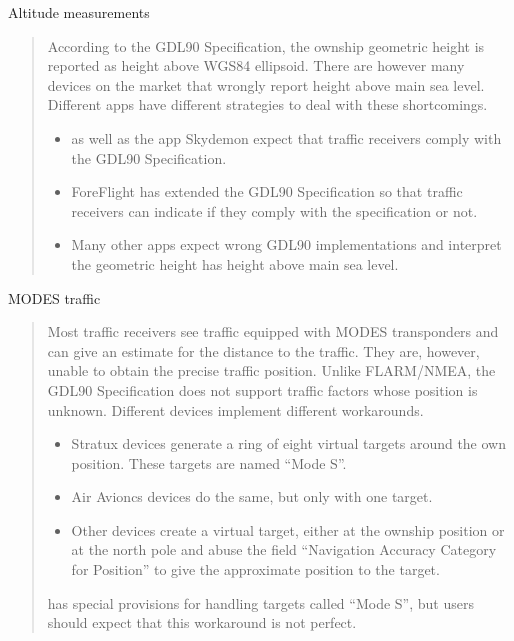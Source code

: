 \documentclass[letterpaper,10pt,english]{sphinxmanual}
\begin{document}
\sphinxAtStartPar
Altitude measurements
\begin{quote}

\sphinxAtStartPar
According to the GDL90 Specification, the ownship geometric height is reported
as height above WGS\sphinxhyphen{}84 ellipsoid.  There are however many devices on the
market that wrongly report height above main sea level.  Different apps have
different strategies to deal with these shortcomings.
\begin{itemize}
\item {} 
\sphinxAtStartPar
{} as well as the app Skydemon expect that
traffic receivers comply with the GDL90 Specification.

\item {} 
\sphinxAtStartPar
ForeFlight has extended the GDL90 Specification so that traffic receivers
can indicate if they comply with the specification or not.

\item {} 
\sphinxAtStartPar
Many other apps expect wrong GDL90 implementations and interpret the
geometric height has height above main sea level.

\end{itemize}
\end{quote}

\sphinxAtStartPar
MODE\sphinxhyphen{}S traffic
\begin{quote}

\sphinxAtStartPar
Most traffic receivers see traffic equipped with MODE\sphinxhyphen{}S transponders and can
give an estimate for the distance to the traffic.  They are, however, unable
to obtain the precise traffic position.  Unlike FLARM/NMEA, the GDL90
Specification does not support traffic factors whose position is unknown.
Different devices implement different workarounds.
\begin{itemize}
\item {} 
\sphinxAtStartPar
Stratux devices generate a ring of eight virtual targets around the own
position.  These targets are named “Mode S”.

\item {} 
\sphinxAtStartPar
Air Avioncs devices do the same, but only with one target.

\item {} 
\sphinxAtStartPar
Other devices create a virtual target, either at the ownship position or at
the north pole and abuse the field “Navigation Accuracy Category for
Position” to give the approximate position to the target.

\end{itemize}

\sphinxAtStartPar
{} has special provisions for handling targets
called “Mode S”, but users should expect that this workaround is not perfect.
\end{quote}
\end{document}

